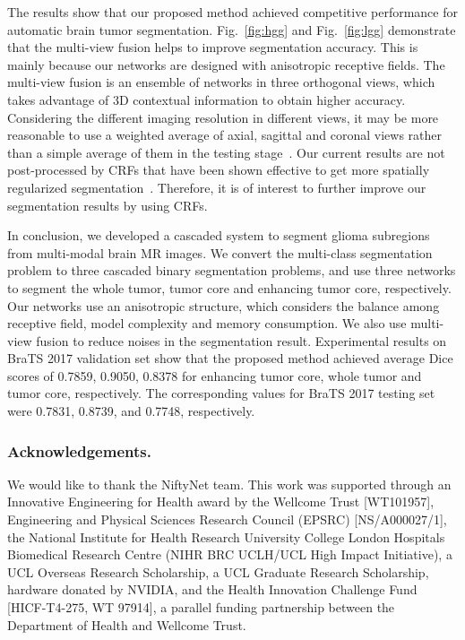 \documentclass[a4paper,orivec,runningheads]{llncs}
\begin{document}
The results show that our proposed method achieved competitive performance for automatic brain tumor segmentation. Fig.~\ref{fig:hgg} and Fig.~\ref{fig:lgg} demonstrate that the multi-view fusion helps to improve segmentation accuracy. This is mainly because our networks are designed with anisotropic receptive fields. The multi-view fusion is an ensemble of networks in three orthogonal views, which takes advantage of 3D contextual information to obtain higher accuracy. Considering the different imaging resolution in different views, it may be more reasonable to use a weighted average of axial, sagittal and coronal views rather than a simple average of them in the testing stage~\cite{Mortazi2017}. Our current results are not post-processed by CRFs that have been shown effective to get more spatially regularized segmentation~\cite{Kamnitsas2017}. Therefore, it is of interest to further improve our segmentation results by using CRFs.  

In conclusion, we developed a cascaded system to segment glioma subregions from multi-modal
brain MR images. We convert the multi-class segmentation problem to three cascaded binary segmentation problems, and use three networks to segment the whole tumor, tumor core and enhancing tumor core, respectively. Our networks use an anisotropic structure, which considers the balance among receptive field, model complexity and memory consumption. We also use multi-view fusion to reduce noises in the segmentation result.  Experimental results on BraTS 2017 validation set show that the proposed method achieved average Dice scores of 0.7859, 0.9050, 0.8378 for enhancing tumor core, whole tumor and tumor core, respectively. The corresponding values for BraTS 2017 testing set were 0.7831, 0.8739, and 0.7748, respectively. 

\subsubsection{Acknowledgements.}\label{sec:acknowledgements}
We would like to thank the NiftyNet team. This work was supported through an Innovative Engineering for Health award by the Wellcome Trust [WT101957], Engineering and Physical Sciences Research Council (EPSRC) [NS/A000027/1], the National Institute for Health Research University College London Hospitals Biomedical Research Centre (NIHR BRC UCLH/UCL High Impact Initiative), a UCL Overseas Research Scholarship, a UCL Graduate Research Scholarship, hardware donated by NVIDIA, and the Health Innovation Challenge Fund [HICF-T4-275, WT 97914], a parallel funding partnership between the Department of Health and Wellcome Trust.


\end{document}

